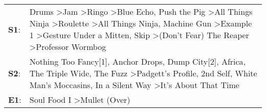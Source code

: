 \begin{supertabular}{p{0.03\textwidth}p{0.92\textwidth}}
 \textbf{S1}:  &  Drums\textsuperscript{} \textgreater \enspace Jam\textsuperscript{} \textgreater \enspace Ringo\textsuperscript{} \textgreater \enspace Blue Echo\textsuperscript{}, \enspace Push the Pig\textsuperscript{} \textgreater \enspace All Things Ninja\textsuperscript{} \textgreater \enspace Roulette\textsuperscript{} \textgreater \enspace All Things Ninja\textsuperscript{}, \enspace Machine Gun\textsuperscript{} \textgreater \enspace Example 1\textsuperscript{} \textgreater \enspace Gesture Under a Mitten\textsuperscript{}, \enspace Skip\textsuperscript{} \textgreater \enspace (Don't Fear) The Reaper\textsuperscript{} \textgreater \enspace Professor Wormbog\textsuperscript{}  \enspace  \\
 \textbf{S2}:  &                                                                                                                                                                                               Nothing Too Fancy[1]\textsuperscript{}, \enspace Anchor Drops\textsuperscript{}, \enspace Dump City[2]\textsuperscript{}, \enspace Africa\textsuperscript{}, \enspace The Triple Wide\textsuperscript{}, \enspace The Fuzz\textsuperscript{} \textgreater \enspace Padgett's Profile\textsuperscript{}, \enspace 2nd Self\textsuperscript{}, \enspace White Man's Moccasins\textsuperscript{}, \enspace In a Silent Way\textsuperscript{} \textgreater \enspace It's About That Time\textsuperscript{}  \enspace  \\
 \textbf{E1}:  &                                                                                                                                                                                                                                                                                                                                                                                                                                                                                                                                                                                                                  Soul Food I\textsuperscript{} \textgreater \enspace Mullet (Over)\textsuperscript{}  \enspace  \\
\end{supertabular}
